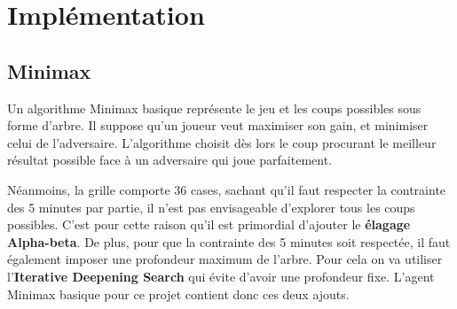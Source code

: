 \documentclass[a4paper,11pt]{article}
\begin{document}
\section{Implémentation}
\label{sec:implémentation}

\subsection{Minimax}
Un algorithme Minimax \citep{russell2021aima} basique représente le jeu et les coups possibles sous forme d'arbre. Il suppose qu'un joueur veut maximiser son gain, et minimiser celui de l'adversaire. L'algorithme choisit dès lors le coup procurant le meilleur résultat possible face à un adversaire qui joue parfaitement.

Néanmoins, la grille comporte 36 cases, sachant qu'il faut respecter la contrainte des 5 minutes par partie, il n'est pas envisageable d'explorer tous les coups possibles.
C'est pour cette raison qu'il est primordial d'ajouter le \textbf{élagage Alpha-beta}.
De plus, pour que la contrainte des 5 minutes soit respectée, il faut également imposer une profondeur maximum de l'arbre. Pour cela on va utiliser l'\textbf{Iterative Deepening Search} qui évite d'avoir une profondeur fixe. L'agent Minimax basique pour ce projet contient donc ces deux ajouts.
\end{document}
